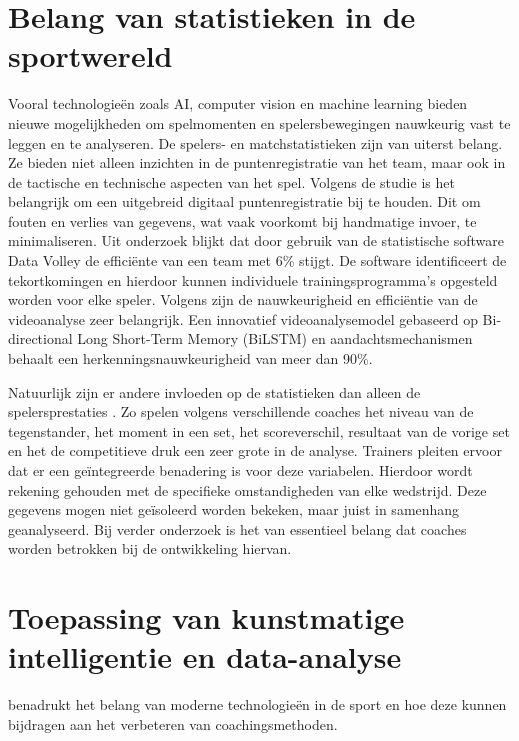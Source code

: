 \section{Belang van statistieken in de sportwereld}
Vooral technologieën zoals AI, computer vision en machine learning bieden nieuwe mogelijkheden om spelmomenten en spelersbewegingen nauwkeurig vast te leggen en te analyseren. De spelers- en matchstatistieken \autocite{Wahyuti2023} zijn van uiterst belang. Ze bieden niet alleen inzichten in de puntenregistratie van het team, maar ook in de tactische en technische aspecten van het spel. Volgens de studie is het belangrijk om een uitgebreid digitaal puntenregistratie bij te houden. Dit om fouten en verlies van gegevens, wat vaak voorkomt bij handmatige invoer, te minimaliseren. Uit onderzoek \autocite{Harabagiu2023} blijkt dat door gebruik van de statistische software Data Volley de efficiënte van een team met 6\% stijgt. De software identificeert de tekortkomingen en hierdoor kunnen individuele trainingsprogramma's opgesteld worden voor elke speler. Volgens \textcite{Ruiye2024} zijn de nauwkeurigheid en efficiëntie van de videoanalyse zeer belangrijk. Een innovatief videoanalysemodel gebaseerd op Bi-directional Long Short-Term Memory (BiLSTM) en aandachtsmechanismen behaalt een herkenningsnauwkeurigheid van meer dan 90\%.

Natuurlijk zijn er andere invloeden op de statistieken dan alleen de spelersprestaties \autocite{LopezSerrano2022}. Zo spelen volgens verschillende coaches het niveau van de tegenstander, het moment in een set, het scoreverschil, resultaat van de vorige set en het de competitieve druk een zeer grote in de analyse. Trainers pleiten ervoor dat er een geïntegreerde benadering is voor deze variabelen. Hierdoor wordt rekening gehouden met de specifieke omstandigheden van elke wedstrijd. Deze gegevens mogen niet geïsoleerd worden bekeken, maar juist in samenhang geanalyseerd. Bij verder onderzoek is het van essentieel belang dat coaches worden betrokken bij de ontwikkeling hiervan.

\section{Toepassing van kunstmatige intelligentie en data-analyse}
\textcite{Fadl2020} benadrukt het belang van moderne technologieën in de sport en hoe deze kunnen bijdragen aan het verbeteren van coachingsmethoden.

